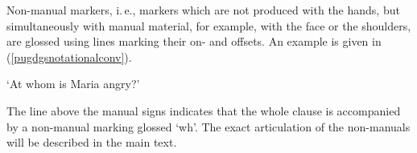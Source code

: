 Non-manual markers, i.\,e., markers which are not produced with the hands, but simultaneously with manual material, for example, with the face or the shoulders, are glossed using lines marking their on- and offsets. An example is given in (\ref{pugdgsnotationalconv}).


\begin{exe}
\ex\label{pugdgsnotationalconv}
\glt `At whom is Maria angry?' \label{ex:pugdgsa} 
\end{exe}




\noindent The line above the manual signs indicates that the whole clause is accompanied by a non-manual marking glossed `wh'. The exact articulation of the non-manuals will be described in the main text. 




